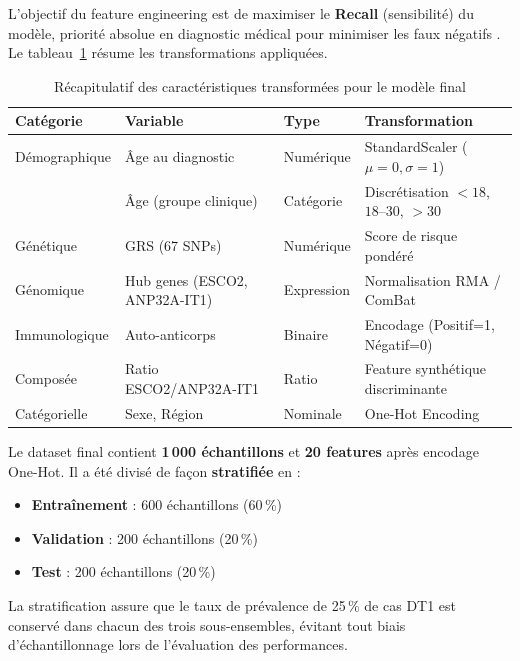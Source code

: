 L'objectif du feature engineering est de maximiser le \textbf{Recall} (sensibilité)
du modèle, priorité absolue en diagnostic médical pour minimiser les faux négatifs
\cite{contreras2018ai}. Le tableau~\ref{tab:features} résume les transformations appliquées.

\begin{table}[h!]
\centering
\caption{Récapitulatif des caractéristiques transformées pour le modèle final}
\label{tab:features}
\begin{tabular}{llll}
\hline
\textbf{Catégorie} & \textbf{Variable} & \textbf{Type} & \textbf{Transformation} \\
\hline
Démographique  & Âge au diagnostic             & Numérique  & StandardScaler ($\mu{=}0, \sigma{=}1$) \\
               & Âge (groupe clinique)         & Catégorie  & Discrétisation $<18$, $18$–$30$, $>30$ \\
Génétique      & GRS (67 SNPs)                 & Numérique  & Score de risque pondéré \\
Génomique      & Hub genes (ESCO2, ANP32A-IT1) & Expression & Normalisation RMA / ComBat \\
Immunologique  & Auto-anticorps                & Binaire    & Encodage (Positif=1, Négatif=0) \\
Composée       & Ratio ESCO2/ANP32A-IT1        & Ratio      & Feature synthétique discriminante \\
Catégorielle   & Sexe, Région                  & Nominale   & One-Hot Encoding \\
\hline
\end{tabular}
\end{table}

Le dataset final contient \textbf{1\,000 échantillons} et \textbf{20 features}
après encodage One-Hot. Il a été divisé de façon \textbf{stratifiée} en :

\begin{itemize}
    \item \textbf{Entraînement} : 600 échantillons (60\,\%)
    \item \textbf{Validation} : 200 échantillons (20\,\%)
    \item \textbf{Test} : 200 échantillons (20\,\%)
\end{itemize}

La stratification assure que le taux de prévalence de 25\,\% de cas DT1 est
conservé dans chacun des trois sous-ensembles, évitant tout biais
d'échantillonnage lors de l'évaluation des performances.

